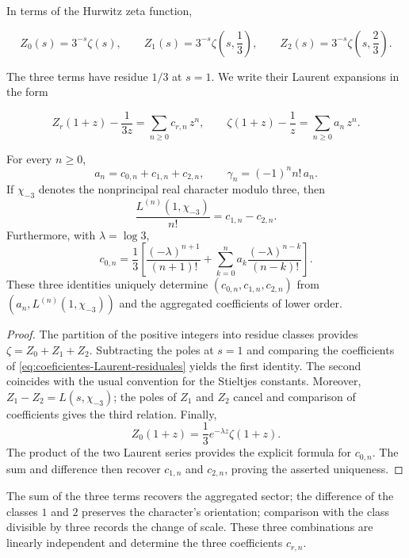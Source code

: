 In terms of the Hurwitz zeta function,

\[
 Z_0(s)=3^{-s}\zeta(s),
 \qquad
 Z_1(s)=3^{-s}\zeta\!\left(s,\frac13\right),
 \qquad
 Z_2(s)=3^{-s}\zeta\!\left(s,\frac23\right).
\]

The three terms have residue $1/3$ at $s=1$. We write their
Laurent expansions in the form

\begin{equation}
 Z_r(1+z)-\frac1{3z}=\sum_{n\geq0}c_{r,n}\,z^n,
 \qquad
 \zeta(1+z)-\frac1z=\sum_{n\geq0}a_n\,z^n.
 \label{eq:coeficientes-Laurent-residuales}
\end{equation}

\begin{theorem}
\label{thm:descomposicion-laurent-triadica}
For every $n\geq0$,
\[
 a_n=c_{0,n}+c_{1,n}+c_{2,n},
 \qquad
 \gamma_n=(-1)^n n!\,a_n.
\]
If $\chi_{-3}$ denotes the nonprincipal real character modulo three, then
\[
 \frac{L^{(n)}(1,\chi_{-3})}{n!}=c_{1,n}-c_{2,n}.
\]
Furthermore, with \(\lambda=\log3\),
\[
 c_{0,n}=\frac13\left[
 \frac{(-\lambda)^{n+1}}{(n+1)!}
 +\sum_{k=0}^{n}a_k\frac{(-\lambda)^{n-k}}{(n-k)!}
 \right].
\]
These three identities uniquely determine
\((c_{0,n},c_{1,n},c_{2,n})\) from
\((a_n,L^{(n)}(1,\chi_{-3}))\) and the aggregated coefficients of lower
order.
\end{theorem}

\begin{proof}
The partition of the positive integers into residue classes provides
$\zeta=Z_0+Z_1+Z_2$. Subtracting the poles at $s=1$ and comparing the
coefficients of \eqref{eq:coeficientes-Laurent-residuales} yields the
first identity. The second coincides with the usual convention for the
Stieltjes constants. Moreover,
$Z_1-Z_2=L(s,\chi_{-3})$; the poles of $Z_1$ and $Z_2$ cancel and
comparison of coefficients gives the third relation. Finally,
\[
 Z_0(1+z)=\frac13e^{-\lambda z}\zeta(1+z).
\]
The product of the two Laurent series provides the explicit formula
for \(c_{0,n}\). The sum and difference then recover
\(c_{1,n}\) and \(c_{2,n}\), proving the asserted uniqueness.
\end{proof}

The sum of the three terms recovers the aggregated sector; the difference of
the classes $1$ and $2$ preserves the character's orientation; comparison
with the class divisible by three records the change of scale. These three
combinations are linearly independent and determine the three
coefficients $c_{r,n}$.

